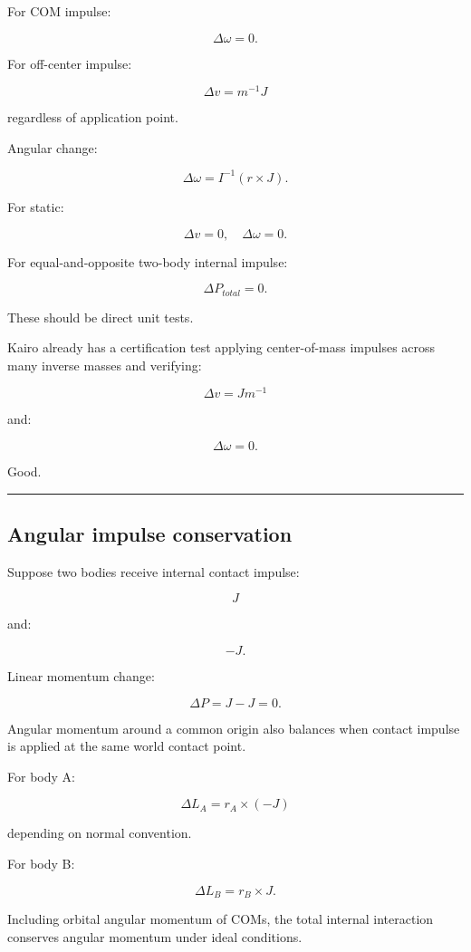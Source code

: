 For COM impulse:

\[
\Delta\omega=0.
\]

For off-center impulse:

\[
\Delta v=m^{-1}J
\]

regardless of application point.

Angular change:

\[
\Delta\omega
=
I^{-1}(r\times J).
\]

For static:

\[
\Delta v=0,
\quad
\Delta\omega=0.
\]

For equal-and-opposite two-body internal impulse:

\[
\Delta P_{total}=0.
\]

These should be direct unit tests.

Kairo already has a certification test applying center-of-mass impulses across many inverse masses and verifying:

\[
\Delta v=Jm^{-1}
\]

and:

\[
\Delta\omega=0.
\]

Good.

\begin{center}\rule{0.5\linewidth}{0.5pt}\end{center}

\subsection{Angular impulse conservation}\label{06-engine-ii-ch038-angular-impulse-conservation}

Suppose two bodies receive internal contact impulse:

\[
J
\]

and:

\[
-J.
\]

Linear momentum change:

\[
\Delta P
=
J-J
=
0.
\]

Angular momentum around a common origin also balances when contact impulse is applied at the same world contact point.

For body A:

\[
\Delta L_A
=
r_A\times(-J)
\]

depending on normal convention.

For body B:

\[
\Delta L_B
=
r_B\times J.
\]

Including orbital angular momentum of COMs, the total internal interaction conserves angular momentum under ideal conditions.

